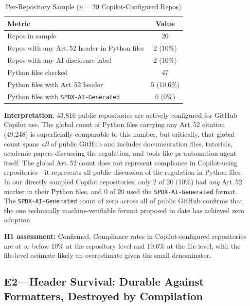 \documentclass[conference]{IEEEtran}
\begin{document}
\begin{table}[htbp]
\caption{Per-Repository Sample ($n = 20$ Copilot-Configured Repos)}
\label{tab:sample}
\begin{center}
\begin{tabular}{lc}
\toprule
Metric & Value \\
\midrule
Repos in sample                                    & 20          \\
Repos with any Art.\,52 header in Python files    & 2 (10\%)    \\
Repos with any AI disclosure label                 & 2 (10\%)    \\
Python files checked                               & 47          \\
Python files with Art.\,52 header                  & 5 (10.6\%)  \\
Python files with \texttt{SPDX-AI-Generated}       & 0 (0\%)     \\
\bottomrule
\end{tabular}
\end{center}
\end{table}

\textbf{Interpretation.}  43,816 public repositories are actively
configured for GitHub Copilot use.  The global count of Python files
carrying any Art.\,52 citation (49,248) is superficially comparable to
this number, but critically, that global count spans \emph{all} of
public GitHub and includes documentation files, tutorials, academic
papers discussing the regulation, and tools like pr-automation-agent
itself.  The global Art.\,52 count does not represent compliance in
Copilot-using repositories---it represents all public discussion of the
regulation in Python files.  In our directly sampled Copilot
repositories, only 2 of 20 (10\%) had \emph{any} Art.\,52 marker in
their Python files, and 0 of 20 used the \texttt{SPDX-AI-Generated}
format.  The \texttt{SPDX-AI-Generated} count of zero across all of
public GitHub confirms that the one technically machine-verifiable format
proposed to date has achieved zero adoption.

\textbf{H1 assessment:} Confirmed.  Compliance rates in
Copilot-configured repositories are at or below 10\% at the repository
level and 10.6\% at the file level, with the file-level estimate likely
an overestimate given the small denominator.

\subsection{E2---Header Survival: Durable Against Formatters, Destroyed
by Compilation}
\end{document}
